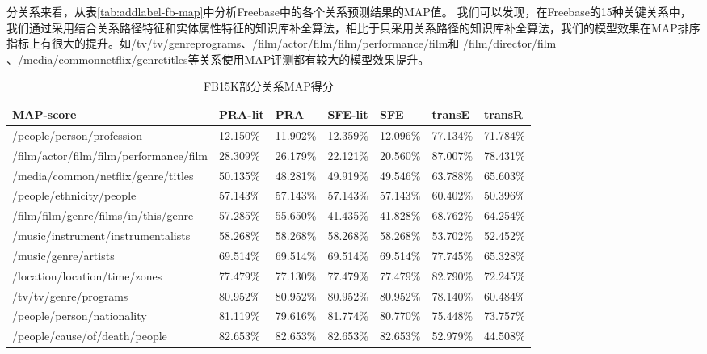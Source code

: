 分关系来看，从表\ref{tab:addlabel-fb-map}中分析Freebase中的各个关系预测结果的MAP值。
我们可以发现，在Freebase的15种关键关系中，
我们通过采用结合关系路径特征和实体属性特征的知识库补全算法，相比于只采用关系路径的知识库补全算法，我们的模型效果在MAP排序指标上有很大的提升。如/tv/tv/genreprograms、/film/actor/film/film/performance/film和 /film/director/film 、/media/commonnetflix/genretitles等关系使用MAP评测都有较大的模型效果提升。

\begin{table}[htbp]
  \centering
  \caption{FB15K部分关系MAP得分}
    \begin{tabular}{|p{5.8cm}|p{1.4cm}|p{1.4cm}|p{1.4cm}|p{1.4cm}|p{1.4cm}|p{1.4cm}|} %
    \hline
    MAP-score & \multicolumn{1}{l|}{PRA-lit  } & \multicolumn{1}{l|}{PRA} & \multicolumn{1}{l|}{SFE-lit} & \multicolumn{1}{l|}{SFE} & \multicolumn{1}{l|}{transE} & \multicolumn{1}{l|}{transR} \\
    \hline
    /people/person/profession & 12.150\% & 11.902\% & 12.359\% & 12.096\% & 77.134\% & 71.784\% \\
    \hline
    /film/actor/film/film/performance/film & 28.309\% & 26.179\% & 22.121\% & 20.560\% & 87.007\% & 78.431\% \\
    \hline
    /media/common/netflix/genre/titles & 50.135\% & 48.281\% & 49.919\% & 49.546\% & 63.788\% & 65.603\% \\
    \hline
    /people/ethnicity/people & 57.143\% & 57.143\% & 57.143\% & 57.143\% & 60.402\% & 50.396\% \\
    \hline
    /film/film/genre/films/in/this/genre & 57.285\% & 55.650\% & 41.435\% & 41.828\% & 68.762\% & 64.254\% \\
    \hline
    /music/instrument/instrumentalists & 58.268\% & 58.268\% & 58.268\% & 58.268\% & 53.702\% & 52.452\% \\
    \hline
    /music/genre/artists & 69.514\% & 69.514\% & 69.514\% & 69.514\% & 77.745\% & 65.328\% \\
    \hline
    /location/location/time/zones & 77.479\% & 77.130\% & 77.479\% & 77.479\% & 82.790\% & 72.245\% \\
    \hline
    /tv/tv/genre/programs & 80.952\% & 80.952\% & 80.952\% & 80.952\% & 78.140\% & 60.484\% \\
    \hline
    /people/person/nationality & 81.119\% & 79.616\% & 81.774\% & 80.770\% & 75.448\% & 73.757\% \\
    \hline
    /people/cause/of/death/people & 82.653\% & 82.653\% & 82.653\% & 82.653\% & 52.979\% & 44.508\% \\

\end{tabular}
\end{table}
